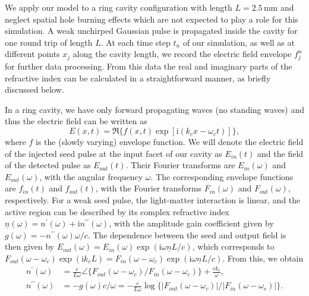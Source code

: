 \documentclass[10pt,letterpaper]{article}%
\begin{document}
We apply our model to a ring cavity configuration with length $L=2.5{\,}%
\mathrm{mm}$ and neglect spatial hole burning effects which are not expected
to play a role for this simulation. A weak unchirped Gaussian pulse is
propagated inside the cavity for one round trip of length $L$. At each time step $t_{n}$ of our
simulation, as well as at different points $x_{j}$ along the cavity length, we
record the electric field envelope $f_{j}^{n}$ for further data processing.
From this data the real and imaginary parts of the refractive index can be
calculated in a straightforward manner, as briefly discussed below.

In a ring cavity, we have only forward propagating waves (no standing waves)
and thus the electric field can be written as
\begin{equation}
E(x,t)=\Re\{f(x,t)\exp\left[  \mathrm{i}(k_{c}x-\omega_{c}t)\right]
\} ,
\end{equation}
where $f$ is the (slowly varying) envelope function. We will denote the
electric field of the injected seed pulse at the input facet of our cavity as
$E_{in}(t)$ and the field of the detected pulse as $E_{out}(t)$. Their Fourier
transforms are $E_{in}(\omega)$ and $E_{out}(\omega)$, with the angular
frequency $\omega$. The corresponding envelope functions are $f_{in}\left(
t\right)  $ and $f_{out}\left(  t\right)  $, with the Fourier transforms
$F_{in}\left(  \omega\right)  $ and $F_{out}\left(  \omega\right) $, respectively. For a
weak seed pulse, the light-matter interaction is linear, and the active region
can be described by its complex refractive index $\underline{n}\left(
\omega\right)  =n^{\prime}\left(  \omega\right)  +\mathrm{i}n^{\prime\prime
}\left(  \omega\right)  $, with the amplitude gain coefficient given by
$g(\omega)=-n^{\prime\prime}(\omega)\omega/c$. The dependence between the seed
and output field is then given by $E_{out}(\omega)=E_{in}(\omega)\exp\left(
\mathrm{i}\omega\underline{n}L/c\right)  $, which corresponds to
$F_{out}(\omega-\omega_{c})\exp(\mathrm{i}k_{c}L)=F_{in}(\omega-\omega
_{c})\exp\left(  \mathrm{i}\omega\underline{n}L/c\right)  $. From this, we
obtain
\begin{align}
n^{\prime}(\omega)  & =\frac{c}{L\omega}\angle\{F_{out}(\omega-\omega
_{c})/F_{in}(\omega-\omega_{c})\}+\frac{ck_{c}}{\omega}, \\
n^{\prime\prime}(\omega)  &  =-g(\omega)c/\omega=-\frac{c}{L\omega}%
\log\{|F_{out}(\omega-\omega_{c})|/|F_{in}(\omega-\omega_{c})|\}.
\label{eq:gaineq}%
\end{align}
\end{document}
